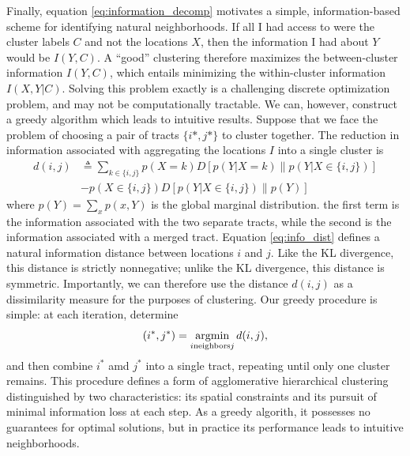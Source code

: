 		Finally, equation \eqref{eq:information_decomp} motivates a simple, information-based scheme for identifying natural neighborhoods. If all I had access to were the cluster labels $C$ and not the locations $X$, then the information I had about $Y$ would be $I(Y,C)$. A ``good'' clustering therefore maximizes the between-cluster information $I(Y,C)$, which entails minimizing the within-cluster information $I(X,Y|C)$. Solving this problem exactly is a challenging discrete optimization problem, and may not be computationally tractable. We can, however, construct a greedy algorithm which leads to intuitive results. Suppose that we face the problem of choosing a pair of tracts $\{i*,j*\}$ to cluster together. The reduction in information associated with aggregating the locations $I$ into a single cluster is 
		\begin{align}
			d(i,j) &\triangleq  \sum_{k \in \{i,j\}} p(X = k)D[p(Y|X = k)\| p(Y|X \in \{i,j\})] \\
			&- p(X\in \{i,j\})D[p(Y|X\in \{i,j\}) \| p(Y)] \label{eq:info_dist}
		\end{align}
		where $p(Y) = \sum_{x} p(x,Y)$ is the global marginal distribution. the first term is the information associated with the two separate tracts, while the second is the information associated with a merged tract. Equation \eqref{eq:info_dist} defines a natural information distance between locations $i$ and $j$. Like the KL divergence, this distance is strictly nonnegative; unlike the KL divergence, this distance is symmetric. Importantly, we can therefore use the distance $d(i,j)$ as a dissimilarity measure for the purposes of clustering. Our greedy procedure is simple: at each iteration, determine
		\begin{equation}
			(i^*,j^*) = \argmin_{i \text{neighbors} j} d(i,j),
		\end{equation}
		and then combine $i^*$ amd $j^*$ into a single tract, repeating until only one cluster remains. This procedure defines a form of agglomerative hierarchical clustering distinguished by two characteristics: its spatial constraints and its pursuit of minimal information loss at each step. As a greedy algorith, it possesses no guarantees for optimal solutions, but in practice its performance leads to intuitive neighborhoods. 

	
